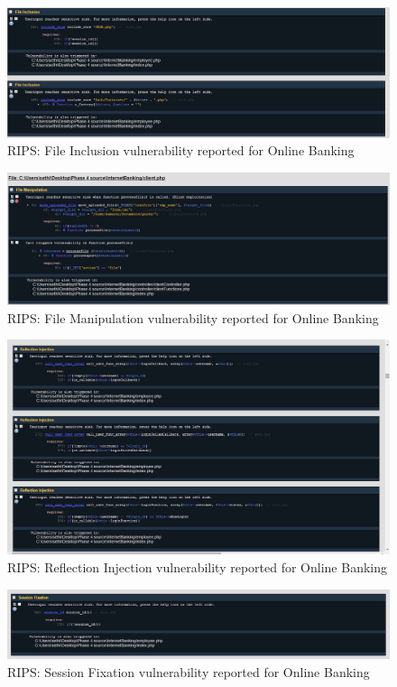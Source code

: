 \begin{figure}[ht]
	\centering
	\includegraphics[width=.8\linewidth]{figures/rips_file_inclusion.png}
	\caption{RIPS: File Inclusion vulnerability reported for Online Banking}
	\label{fig:rips_file_inclusion}
\end{figure}

\begin{figure}[ht]
	\centering
	\includegraphics[width=.8\linewidth]{figures/rips_file_manipulation.png}
	\caption{RIPS: File Manipulation vulnerability reported for Online Banking}
	\label{fig:rips_file_manipulation}
\end{figure}

\begin{figure}[ht]
	\centering
	\includegraphics[width=.8\linewidth]{figures/rips_reflection_injection.png}
	\caption{RIPS: Reflection Injection vulnerability reported for Online Banking}
	\label{fig:rips_reflection_injection}
\end{figure}

\begin{figure}[ht]
	\centering
	\includegraphics[width=.8\linewidth]{figures/rips_session_fixation.png}
	\caption{RIPS: Session Fixation vulnerability reported for Online Banking}
	\label{fig:rips_session_fixation}
\end{figure}


